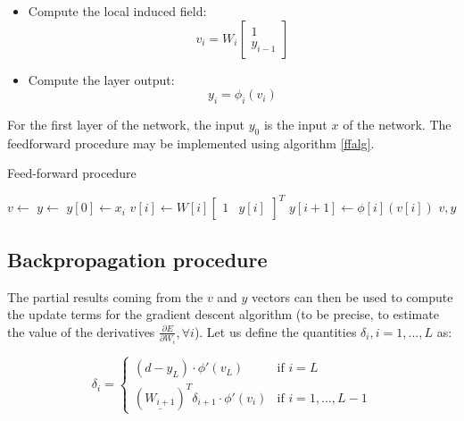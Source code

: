 \documentclass[letterpaper,headings=standardclasses]{scrartcl}
\begin{document}
\begin{itemize}
    \item Compute the local induced field:
    $$ v_i = W_i \left[ \begin{matrix} 1 \\ y_{i - 1} \end{matrix} \right] $$
    \item Compute the layer output:
    $$ y_i = \phi_i (v_i) $$
\end{itemize}

For the first layer of the network, the input $y_0$ is the input $x$ of the network. The feedforward procedure may be implemented using algorithm \ref{ffalg}.

\begin{algorithm}[h]
    \caption{Feed-forward procedure}
    \label{ffalg}
    \begin{algorithmic}
    
        \State {}
        \State $v \gets $ 
        \State $y \gets $ 
        \State $y[0] \gets x_i$
        \State {}
            \State $v[i] \gets W[i] \left[ \begin{matrix} 1 & y[i] \end{matrix} \right]^T$
            \State $y[i + 1] \gets \phi[i](v[i])$
        \EndFor
        \State \Return $v, y$
    \EndFunction
    
    \end{algorithmic}
\end{algorithm}

\subsection{Backpropagation procedure}

The partial results coming from the $v$ and $y$ vectors can then be used to compute the update terms for the gradient descent algorithm (to be precise, to estimate the value of the derivatives $\frac{\partial E}{\partial W_i}, \forall i$). Let us define the quantities $\delta_i, i = 1, \dots, L$ as:

$$ \delta_i = \begin{cases} (d - y_L) \cdot \phi'(v_L) & \text{if } i = L \\ \left( \underline{W_{i + 1}} \right)^T \delta_{i + 1} \cdot \phi'(v_i) & \text{if } i = 1, \dots, L - 1 \end{cases} $$
\end{document}
